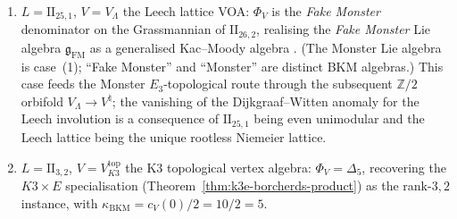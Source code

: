 \begin{remark}
\begin{enumerate}[label=\textup{(\arabic*)}]
 \emph{Subscript discipline.} The integer
 $196884 = \dim V^\natural_2 = c_V(1)$ is the shifted-grade-$1$
 Monster-module dimension, \emph{not} a value of any
 $\kappa_\bullet$ in $\{\kappa_{\mathrm{ch}}, \kappa_{\mathrm{cat}},
 \kappa_{\mathrm{BKM}}, \kappa_{\mathrm{fiber}}\}$: it is a
 representation dimension of the Monster module, and labelling it
 $\kappa_\bullet$ with undeclared subscript conflates a graded
 character coefficient with a modular characteristic. The
 moonshine-convention ambiguity between the Conway--Norton
 genus-zero list \cite{ConwayNorton1979} and the FLM vertex-algebra
 construction \cite{FrenkelLepowskyMeurman1988} is resolved here
 by the FLM choice: $V^\natural$ is the FLM VOA, the Monster
 acts as its $\mathrm{Aut}(V^\natural)$-symmetry
 \cite[Thm.~1.1]{FrenkelLepowskyMeurman1988}. The trivial VA $V =
 \mathbb{C}$ has $\chi_V = 1$ and yields only the trivial product;
 it does not produce $J(\tau)$.
 \item $L = \mathrm{II}_{25,1}$, $V = V_\Lambda$ the Leech lattice VOA:
 $\Phi_V$ is the \emph{Fake Monster} denominator on the Grassmannian
 of $\mathrm{II}_{26,2}$, realising the \emph{Fake Monster} Lie algebra
 $\mathfrak{g}_{\mathrm{FM}}$ as a generalised Kac--Moody algebra
 \cite{Borcherds1992}. (The Monster Lie algebra is case~(1);
 ``Fake Monster'' and ``Monster'' are distinct BKM algebras.) This
 case feeds the Monster $E_3$-topological route through the
 subsequent $\mathbb{Z}/2$ orbifold
 $V_\Lambda \to V^\natural$; the vanishing of the Dijkgraaf--Witten
 anomaly for the Leech involution is a consequence of
 $\mathrm{II}_{25,1}$ being even unimodular and the Leech lattice
 being the unique rootless Niemeier lattice.
 \item $L = \mathrm{II}_{3,2}$, $V = V_{K3}^{\mathrm{top}}$ the K3 topological vertex algebra: $\Phi_V = \Delta_5$, recovering the $K3 \times E$ specialisation (Theorem~\ref{thm:k3e-borcherds-product}) as the rank-$3,2$ instance, with $\kappa_{\mathrm{BKM}} = c_V(0)/2 = 10/2 = 5$.
\end{enumerate}
\end{remark}

